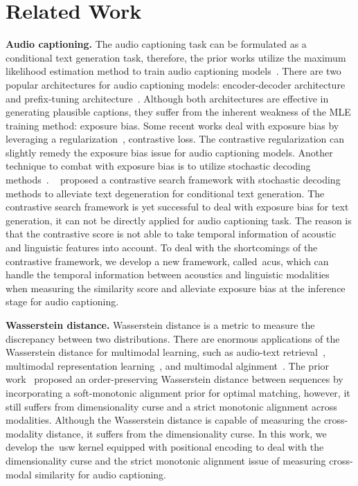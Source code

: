 \section{Related Work}
\label{related_work}
\textbf{Audio captioning.} The audio captioning task can be formulated as a conditional text generation task, therefore, the prior works utilize the maximum likelihood estimation method to train audio captioning models~\citep{Mei2021AudioCT, mei2024wavcaps, Sun2023DualTD, kim2022exploring, deshmukh2023pengi}. There are two popular architectures for audio captioning models: encoder-decoder architecture~\cite{mei2024wavcaps, kim2024enclap} and prefix-tuning architecture~\citep{deshmukh2023pengi, Kim2023PrefixTF}. Although both architectures are effective in generating plausible captions, they suffer from the inherent weakness of the MLE training method: exposure bias. Some recent works deal with exposure bias by leveraging a regularization~\citep{zhang2023actual, deshmukh2024training}, contrastive loss. The contrastive regularization can slightly remedy the exposure bias issue for audio captioning models. Another technique to combat with exposure bias is to utilize stochastic decoding methods~\citep{arora2022exposure}. ~\citep{su2022contrastive} proposed a contrastive search framework with stochastic decoding methods to alleviate text degeneration for conditional text generation. The contrastive search framework is yet successful to deal with exposure bias for text generation, it can not be directly applied for audio captioning task. The reason is that the contrastive score is not able to take temporal information of acoustic and linguistic features into account. To deal with the shortcomings of the contrastive framework, we develop a new framework, called~\acrshort{acus}, which can handle the temporal information between acoustics and linguistic modalities when measuring the similarity score and alleviate exposure bias at the inference stage for audio captioning. 


\textbf{Wasserstein distance.} Wasserstein distance is a metric to measure the discrepancy between two distributions. There are enormous applications of the Wasserstein distance for multimodal learning, such as audio-text retrieval~\citep{luong2024revisiting}, multimodal representation learning~\citep{tsai2018learning}, and multimodal alginment~\citep{lee2019hierarchical}. The prior work~\citep{su2017order} proposed an order-preserving Wasserstein distance between sequences by incorporating a soft-monotonic alignment prior for optimal matching, however, it still suffers from dimensionality curse and a strict monotonic alignment across modalities. Although the Wasserstein distance is capable of measuring the cross-modality distance, it suffers from the dimensionality curse. In this work, we develop the~\acrshort{usw} kernel equipped with positional encoding to deal with the dimensionality curse and the strict monotonic alignment issue of measuring cross-modal similarity for audio captioning.